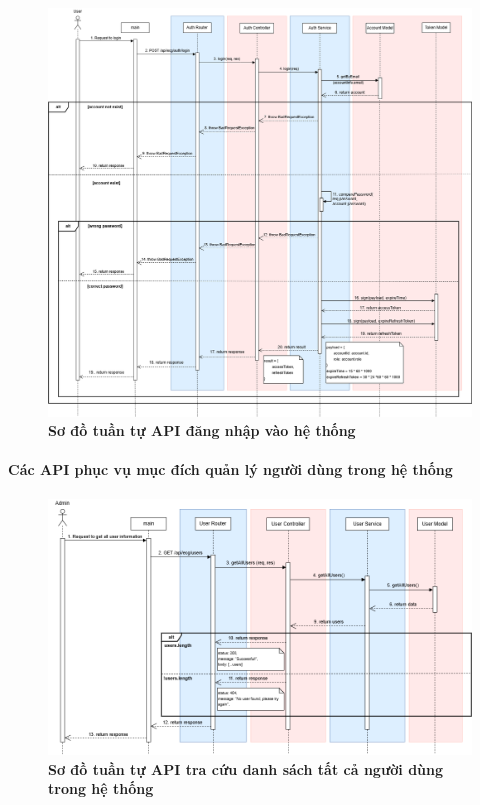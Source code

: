 \begin{figure}[H]
	\centering
	\includegraphics[width=16cm]{Images/api_sequence/authen/authentication-login.drawio.png}
	\caption[Sơ đồ tuần tự API đăng nhập vào hệ thống]{\bfseries \fontsize{12pt}{0pt}\selectfont Sơ đồ tuần tự API đăng nhập vào hệ thống}
	\label{sequence_diagram_login}
\end{figure}

\paragraph{Các API phục vụ mục đích quản lý người dùng trong hệ thống}
\mbox{}
\begin{figure}[H]
	\centering
	\includegraphics[width=16cm]{Images/api_sequence/user/getAllUsers.drawio.png}
	\caption[Sơ đồ tuần tự API tra cứu danh sách tất cả người dùng trong hệ thống]{\bfseries \fontsize{12pt}{0pt}\selectfont Sơ đồ tuần tự API tra cứu danh sách tất cả người dùng trong hệ thống}
	\label{sequence_diagram_get_all_users}
\end{figure}

